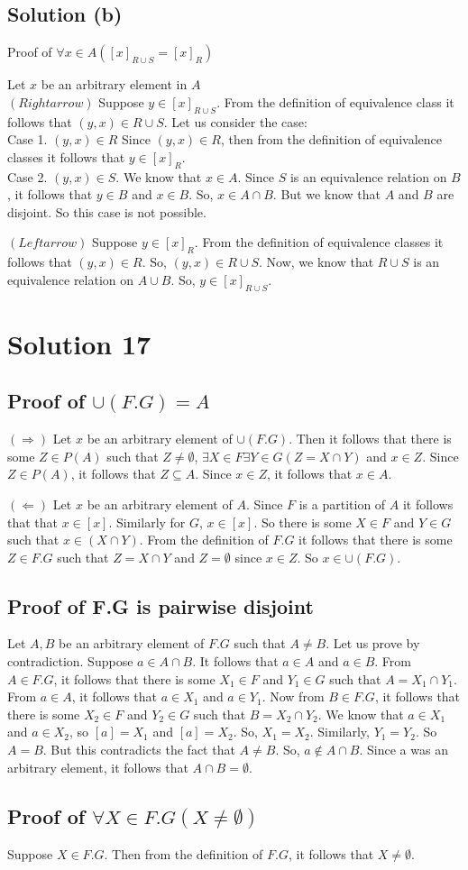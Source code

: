 \documentclass{article}
\begin{document}
\subsection{Solution (b)}
Proof of $\forall x \in A ([x]_{R \cup S} = [x]_R)$

Let $x$ be an arbitrary element in $A$
\\ $(Rightarrow)$ Suppose $y \in [x]_{R \cup S}$. From the definition
of equivalence class it follows that $(y,x) \in R \cup S$. Let us
consider the case:
\\ Case 1. $(y,x) \in R$ Since $(y,x) \in R$, then from the definition of
equivalence classes it follows that $y \in [x]_R$.
\\ Case 2. $(y,x) \in S$. We know that $x \in A$. Since $S$ is an
equivalence relation on $B$, it follows that $y \in B$ and $x \in B$.
So, $x \in A \cap B$. But we know that $A$ and $B$ are disjoint. So
this case is not possible.

$(Leftarrow)$ Suppose $y \in [x]_R$. From the definition of
equivalence classes it follows that $(y,x) \in R$. So, $(y,x) \in R
\cup S$. Now, we know that $R \cup S$ is an equivalence relation on $A
\cup B$. So, $y \in [x]_{R \cup S}$.

\section{Solution 17}
\subsection{Proof of $\cup (F.G) = A$}
$(\Rightarrow)$ Let $x$ be an arbitrary element of $\cup (F.G)$. Then
it follows that there is some $Z \in P(A)$ such that $Z \neq
\emptyset$, $\exists X \in F \exists Y \in G(Z = X \cap Y)$ and $x
\in Z$. Since $Z \in P(A)$, it follows that $Z \subseteq A$. Since $x
\in Z$, it follows that $x \in A$.

$(\Leftarrow)$ Let $x$ be an arbitrary element of $A$. Since $F$ is a
partition of $A$ it follows that that $x \in [x]$. Similarly for $G$,
$x \in [x]$. So there is some $X \in F$ and $Y \in G$ such that
$x \in (X \cap Y)$. From the definition of $F.G$ it follows that there
is some $Z \in F.G$ such that $Z = X \cap Y$ and $Z = \emptyset$ since
$x \in Z$. So $x \in \cup(F.G)$.

\subsection{Proof of F.G is pairwise disjoint}
Let $A,B$ be an arbitrary element of $F.G$ such that $A \neq B$. Let
us prove by contradiction. Suppose $a \in A \cap B$. It follows that
$a \in A$ and $a \in B$. From $A \in F.G$, it follows that there is
some $X_1 \in F$ and $Y_1 \in G$ such that $A = X_1 \cap Y_1$. From $a
\in A$, it follows that $a \in X_1$ and $a \in Y_1$. Now from $B \in
F.G$, it follows that there is some $X_2 \in F$ and $Y_2 \in G$ such
that $B = X_2 \cap Y_2$. We know that $a \in X_1$ and $a \in X_2$, so
$[a] = X_1$ and $[a] = X_2$. So, $X_1 = X_2$. Similarly, $Y_1 = Y_2$.
So $A = B$. But this contradicts the fact that $A \neq B$. So, $a
\notin A \cap B$. Since a was an arbitrary element, it follows that $A
\cap B = \emptyset$.

\subsection{Proof of $\forall X \in F.G(X \neq \emptyset)$}
Suppose $X \in F.G$. Then from the definition of $F.G$, it follows
that $X \neq \emptyset$.
\end{document}
